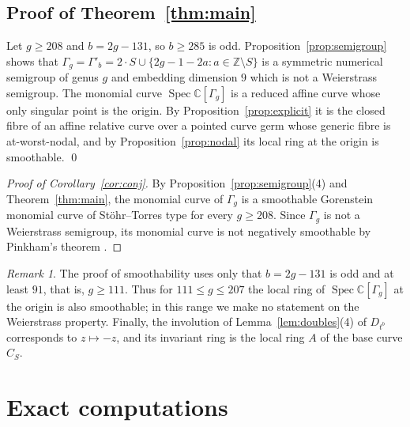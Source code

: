 \documentclass{amsart}
\theoremstyle{definition}
\theoremstyle{remark}
\newtheorem{remark}[theorem]{Remark}
\numberwithin{equation}{section}
\newcommand{\C}{\mathbb{C}}
\newcommand{\Z}{\mathbb{Z}}
\DeclareMathOperator{\Spec}{Spec}
\begin{document}
\subsection{Proof of Theorem~\ref{thm:main}}
Let $g\ge208$ and $b=2g-131$, so $b\ge285$ is odd. Proposition~\ref{prop:semigroup} shows that $\Gamma_g=\Gamma'_b=2\cdot S\cup\{2g-1-2a:a\in\Z\setminus S\}$ is a symmetric numerical semigroup of genus $g$ and embedding dimension $9$ which is not a Weierstrass semigroup. The monomial curve $\Spec\C[\Gamma_g]$ is a reduced affine curve whose only singular point is the origin. By Proposition~\ref{prop:explicit} it is the closed fibre of an affine relative curve over a pointed curve germ whose generic fibre is at-worst-nodal, and by Proposition~\ref{prop:nodal} its local ring at the origin is smoothable. \qed

\begin{proof}[Proof of Corollary~\ref{cor:conj}]
By Proposition~\ref{prop:semigroup}(4) and Theorem~\ref{thm:main}, the monomial curve of $\Gamma_g$ is a smoothable Gorenstein monomial curve of St\"ohr--Torres type for every $g\ge208$. Since $\Gamma_g$ is not a Weierstrass semigroup, its monomial curve is not negatively smoothable by Pinkham's theorem \cite[Theorem~2.12]{Ste}.
\end{proof}

\begin{remark}\label{rem:range}
The proof of smoothability uses only that $b=2g-131$ is odd and at least $91$, that is, $g\ge111$. Thus for $111\le g\le207$ the local ring of $\Spec\C[\Gamma_g]$ at the origin is also smoothable; in this range we make no statement on the Weierstrass property. Finally, the involution of Lemma~\ref{lem:doubles}(4) of $D_{t^b}$ corresponds to $z\mapsto-z$, and its invariant ring is the local ring $A$ of the base curve $C_S$.
\end{remark}

\appendix

\section{Exact computations}\label{app:computations}
\end{document}
